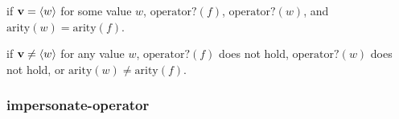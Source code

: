 \documentclass{sigplanconf}
\begin{document}
\noindent
if $\mathbf{v}=\langle w\rangle$ for some value $w$, $\mathrm{operator?}(f)$, $\mathrm{operator?}(w)$, and $\mathrm{arity}(w)=\mathrm{arity}(f)$.

\noindent
{}

\noindent
if $\mathbf{v}\ne\langle w\rangle$ for any value $w$, $\mathrm{operator?}(f)$ does not hold, $\mathrm{operator?}(w)$ does not hold, or $\mathrm{arity}(w)\ne\mathrm{arity}(f)$.










\subsubsection{impersonate-operator}
\end{document}
